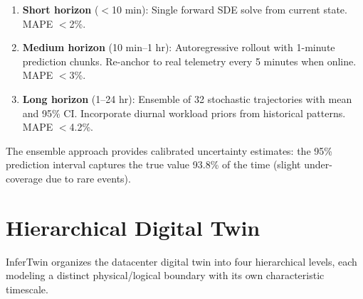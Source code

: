 \documentclass[conference,10pt]{IEEEtran}
\begin{document}
\begin{enumerate}
\item \textbf{Short horizon} ($<$10 min): Single forward SDE solve from current state. MAPE $<$2\%.
\item \textbf{Medium horizon} (10 min--1 hr): Autoregressive rollout with 1-minute prediction chunks. Re-anchor to real telemetry every 5 minutes when online. MAPE $<$3\%.
\item \textbf{Long horizon} (1--24 hr): Ensemble of 32 stochastic trajectories with mean and 95\% CI. Incorporate diurnal workload priors from historical patterns. MAPE $<$4.2\%.
\end{enumerate}

The ensemble approach provides calibrated uncertainty estimates: the 95\% prediction interval captures the true value 93.8\% of the time (slight under-coverage due to rare events).

\section{Hierarchical Digital Twin}
\label{sec:twin}

InferTwin organizes the datacenter digital twin into four hierarchical levels, each modeling a distinct physical/logical boundary with its own characteristic timescale.
\end{document}
